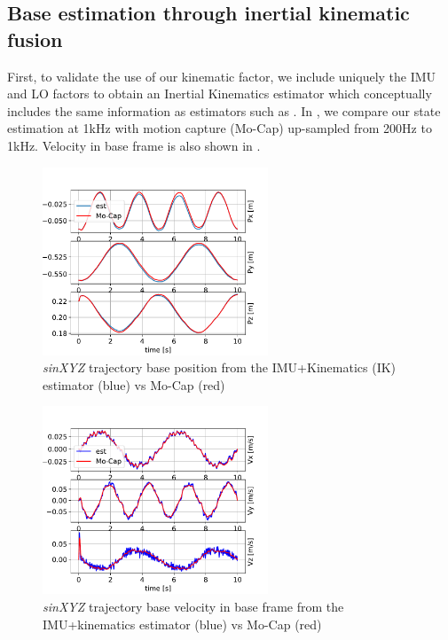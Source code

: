 \subsection{Base estimation through inertial kinematic fusion}
First, to validate the use of our kinematic factor, we include uniquely the IMU and LO factors to obtain an Inertial Kinematics  estimator which 
conceptually includes the same information as estimators such as \cite{bloesch2013state}. In , we compare our state estimation 
at 1kHz with motion capture (Mo-Cap) up-sampled from 200Hz to 1kHz.
Velocity in base frame is also shown in .

\begin{figure}[h]
    \centering
    \includegraphics[width=0.6\textwidth]{figures/centroidal/base_position_IK4.pdf}
    \caption{\textit{sinXYZ} trajectory base position from the IMU+Kinematics (IK) estimator (blue) vs Mo-Cap (red)}
    \label{fig:PosiIK4}
\end{figure}

\begin{figure}[h]
    \centering
    \includegraphics[width=0.6\textwidth]{figures/centroidal/base_velocity_base_frame_IK4.pdf}
    \caption{\textit{sinXYZ} trajectory base velocity in base frame from the IMU+kinematics estimator (blue) vs Mo-Cap (red)}
    \label{fig:VelIK4}
\end{figure}

